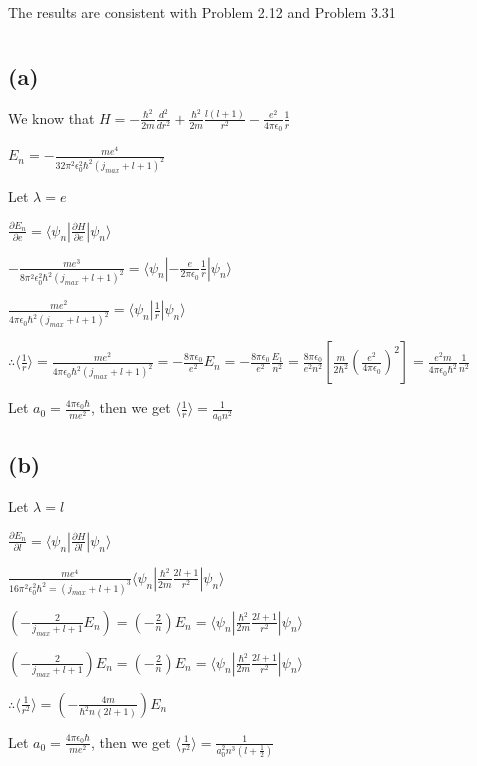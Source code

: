 \documentclass[12pt]{article}
\begin{document}
\begin{spacing}{2.0}
The results are consistent with Problem 2.12 and Problem 3.31

\section{} %

\subsection*{(a)}

We know that $H=-\frac{\hbar^2}{2m} \frac{d^2}{dr^2} + \frac{\hbar^2}{2m} \frac{l(l+1)}{r^2} - \frac{e^2}{4\pi \epsilon_0}\frac{1}{r}$

$E_n=-\frac{me^4}{32\pi^2 \epsilon_0^2 \hbar^2 (j_{max}+l+1)^2}$

Let $\lambda=e$

$\frac{\partial E_n}{\partial e}= \langle \psi_n|\frac{\partial H}{\partial e}|\psi_n \rangle$

$-\frac{me^3}{8\pi^2 \epsilon_0^2 \hbar^2 (j_{max}+l+1)^2}
= \langle \psi_n|
-\frac{e}{2\pi\epsilon_0} \frac{1}{r}
|\psi_n \rangle$

$\frac{me^2}{4\pi \epsilon_0 \hbar^2 (j_{max}+l+1)^2}
= \langle \psi_n|
\frac{1}{r}
|\psi_n \rangle$

$\therefore \langle \frac{1}{r} \rangle = \frac{me^2}{4\pi \epsilon_0 \hbar^2 (j_{max}+l+1)^2} = -\frac{8\pi\epsilon_0}{e^2} E_n = -\frac{8\pi\epsilon_0}{e^2} \frac{E_1}{n^2} = \frac{8\pi\epsilon_0}{e^2n^2} \left[ \frac{m}{2\hbar^2} \left( \frac{e^2}{4\pi\epsilon_0} \right)^2 \right] = \frac{e^2m}{4\pi\epsilon_0\hbar^2}\frac{1}{n^2}$

Let $a_0=\frac{4\pi\epsilon_0 \hbar}{me^2}$, then we get $\langle \frac{1}{r} \rangle = \frac{1}{a_0 n^2}$

\subsection*{(b)}

Let $\lambda=l$

$\frac{\partial E_n}{\partial l}= \langle \psi_n|\frac{\partial H}{\partial l}|\psi_n \rangle$

$\frac{me^4}{16\pi^2 \epsilon_0^2 \hbar^2 = (j_{max}+l+1)^3}
\langle \psi_n|
\frac{\hbar^2}{2m} \frac{2l+1}{r^2}
|\psi_n \rangle$



$\left( -\frac{2}{j_{max}+l+1}E_n \right)=
\left( -\frac{2}{n} \right) E_n=
\langle \psi_n|
\frac{\hbar^2}{2m} \frac{2l+1}{r^2}
|\psi_n \rangle$



$\left( -\frac{2}{j_{max}+l+1} \right) E_n=
\left( -\frac{2}{n} \right) E_n=
\langle \psi_n|
\frac{\hbar^2}{2m} \frac{2l+1}{r^2}
|\psi_n \rangle$

$\therefore \langle \frac{1}{r^2} \rangle= \left( -\frac{4m}{\hbar^2 n(2l+1)} \right) E_n $

Let $a_0=\frac{4\pi\epsilon_0 \hbar}{me^2}$, then we get $\langle \frac{1}{r^2} \rangle = \frac{1}{a_0^2 n^3 \left(l+\frac{1}{2}\right)}$

\end{spacing}
\end{document}
